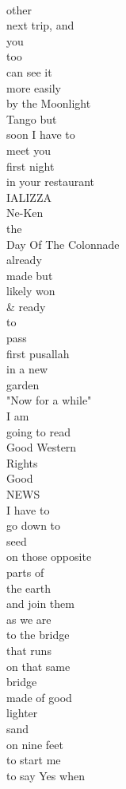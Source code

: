 \documentclass[smalldemyvopaper,11pt,twoside,onecolumn,openright,extrafontsizes]{memoir}
\begin{document}
\\other
\\next trip, and
\\you
\\too
\\can see it
\\more easily
\\by the Moonlight
\\Tango but
\\soon I have to
\\meet you
\\first night
\\in your restaurant
\\IALIZZA
\\Ne-Ken
\\the
\\Day Of The Colonnade
\\already
\\made but
\\likely won
\\\& ready
\\to
\\pass
\\first pusallah
\\in a new
\\garden
\\"Now for a while"
\\I am
\\going to read
\\Good Western
\\Rights
\\Good
\\NEWS
\\I have to
\\go down to
\\seed
\\on those opposite
\\parts of
\\the earth
\\and join them
\\as we are
\\to the bridge
\\that runs
\\on that same
\\bridge
\\made of good
\\lighter
\\sand
\\on nine feet
\\to start me
\\to say Yes when
\end{document}
